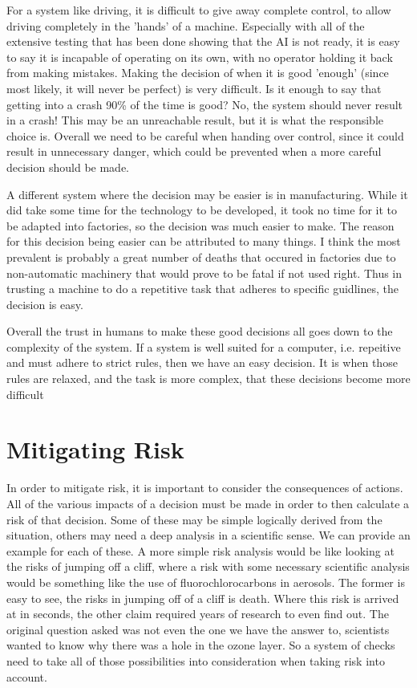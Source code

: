 \documentclass[12pt]{article}
\begin{document}
For a system like driving, it is difficult to give away complete control, to allow driving completely in the 'hands' of a machine. Especially with all of the extensive testing that has been done showing that the AI is not ready, it is easy to say it is incapable of operating on its own, with no operator holding it back from making mistakes. Making the decision of when it is good 'enough' (since most likely, it will never be perfect) is very difficult. Is it enough to say that getting into a crash 90\% of the time is good? No, the system should never result in a crash! This may be an unreachable result, but it is what the responsible choice is. Overall we need to be careful when handing over control, since it could result in unnecessary danger, which could be prevented when a more careful decision should be made.

A different system where the decision may be easier is in manufacturing. While it did take some time for the technology to be developed, it took no time for it to be adapted into factories, so the decision was much easier to make. The reason for this decision being easier can be attributed to many things. I think the most prevalent is probably a great number of deaths that occured in factories due to non-automatic machinery that would prove to be fatal if not used right. Thus in trusting a machine to do a repetitive task that adheres to specific guidlines, the decision is easy.

Overall the trust in humans to make these good decisions all goes down to the complexity of the system. If a system is well suited for a computer, i.e. repeitive and must adhere to strict rules, then we have an easy decision. It is when those rules are relaxed, and the task is more complex, that these decisions become more difficult
\pagebreak
\section{Mitigating Risk}
In order to mitigate risk, it is important to consider the consequences of actions. All of the various impacts of a decision must be made in order to then calculate a risk of that decision. Some of these may be simple logically derived from the situation, others may need a deep analysis in a scientific sense. We can provide an example for each of these. A more simple risk analysis would be like looking at the risks of jumping off a cliff, where a risk with some necessary scientific analysis would be something like the use of fluorochlorocarbons in aerosols. The former is easy to see, the risks in jumping off of a cliff is death. Where this risk is arrived at in seconds, the other claim required years of research to even find out. The original question asked was not even the one we have the answer to, scientists wanted to know why there was a hole in the ozone layer. So a system of checks need to take all of those possibilities into consideration when taking risk into account.
\end{document}

